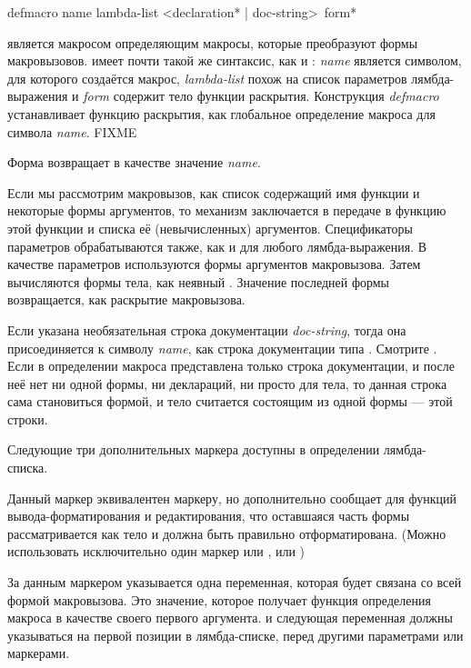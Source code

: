\begin{defmac}
defmacro name lambda-list <{declaration}* | doc-string> {\,form}*

 является макросом определяющим макросы, которые преобразуют формы
макровызовов.
 имеет почти такой же синтаксис, как и :
\emph{name} является символом, для которого создаётся макрос,
\emph{lambda-list} похож на список параметров лямбда-выражения и 
\emph{form} содержит тело функции раскрытия.
Конструкция \emph{defmacro} устанавливает функцию раскрытия, как глобальное
определение макроса для символа \emph{name}.
FIXME

Форма  возвращает в качестве значение \emph{name}.

Если мы рассмотрим макровызов, как список содержащий имя функции и некоторые
формы аргументов, то механизм заключается в передаче в функцию  этой
функции и списка её (невычисленных) аргументов.
Спецификаторы параметров обрабатываются также, как и для любого лямбда-выражения.
В качестве параметров используются формы аргументов макровызова.
Затем вычисляются формы тела, как неявный . Значение последней формы
возвращается, как раскрытие макровызова.

Если указана необязательная строка документации \emph{doc-string}, тогда она
присоединяется к символу \emph{name}, как строка документации типа
. Смотрите .
Если в определении макроса представлена только строка документации, и после неё
нет ни одной формы, ни деклараций, ни просто для тела, то данная строка сама
становиться формой, и тело считается состоящим из одной формы --- этой строки.

Следующие три дополнительных маркера доступны в определении лямбда-списка.
\begin{indentdesc}{6pc}
\item[\cd{\&body}]

Данный маркер эквивалентен  маркеру, но дополнительно сообщает для
функций вывода-форматирования и редактирования, что оставшаяся часть формы
рассматривается как тело и должна быть правильно отформатирована.
(Можно использовать исключительно один маркер или , или )

\item[\cd{\&whole}]
За данным маркером указывается одна переменная, которая будет связана со всей
формой макровызова. Это значение, которое получает функция определения макроса в
качестве своего первого аргумента.
 и следующая переменная должны указываться на первой позиции в
лямбда-списке, перед другими параметрами или маркерами.


\end{indentdesc}
\end{defmac}

